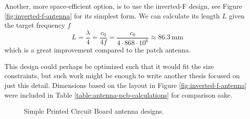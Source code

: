 Another, more space-efficient option, is to use the inverted-F design, see Figure \ref{fig:inverted-f-antenna} for its simplest form. We can calculate its length $L$ given the target frequency $f$
\begin{equation}
    L = \dfrac{\lambda}{4} = \dfrac{c_0}{4f} = \dfrac{c_0}{4 \cdot 868 \cdot 10^6} \approx 86.3~\mathrm{mm}
\end{equation}
which is a great improvement compared to the patch antenna.

This design could perhaps be optimized such that it would fit the size constraints, but such work might be enough to write another thesis focused on just this detail. Dimensions based on the layout in Figure \ref{fig:inverted-f-antenna} were included in Table \ref{table:antenna-pcb-calculations} for comparison sake.

\begin{figure}
    \centering
    \hfill
    \caption{Simple Printed Circuit Board antenna designs.}
\end{figure}

